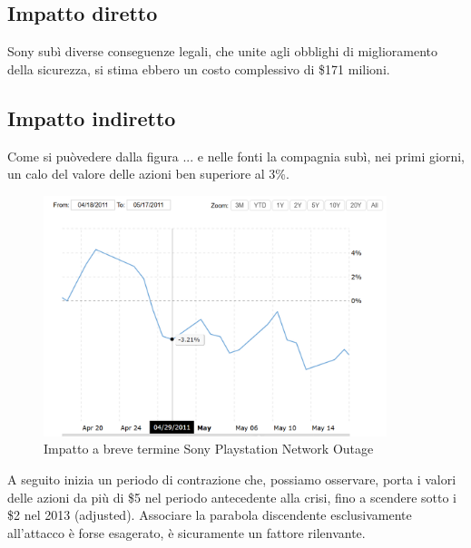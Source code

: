 \documentclass[12pt,a4paper,openright,twoside]{report}
\begin{document}
\subsection{Impatto diretto}
Sony sub\`i diverse conseguenze legali, che unite agli obblighi di miglioramento della sicurezza, si stima ebbero un costo complessivo di \$171 milioni.\\
\subsection{Impatto indiretto}
Come si pu\`ovedere dalla figura ... e nelle fonti \cite{Sony_pnt} la compagnia sub\`i, nei primi giorni, un calo del valore delle azioni ben superiore al 3\%.\\

\begin{figure}[h] 
\begin{center} 
\includegraphics[width=10cm]{figures/sony_2011_shortTerm.png} 
\caption[Grafico Sony PSN short]{Impatto a breve termine Sony Playstation Network Outage}\label{fig:pnt1}
\end{center}
\end{figure}

A seguito inizia un periodo di contrazione che, possiamo osservare, porta i valori delle azioni da pi\`u di \$5 nel periodo antecedente alla crisi, fino a scendere sotto i \$2 nel 2013 (adjusted). Associare la parabola discendente esclusivamente all'attacco \`e forse esagerato, \`e sicuramente un fattore rilenvante.\\ 
\end{document}
